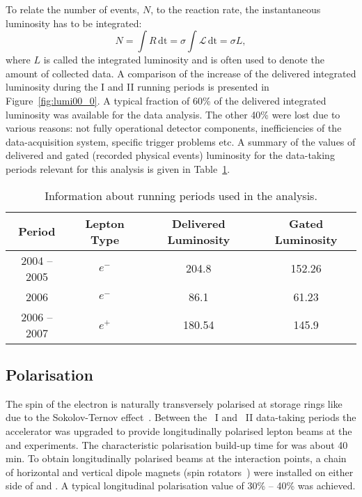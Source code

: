 To relate the number of events, $N$, to the reaction rate, the instantaneous luminosity has to be integrated:
\begin{equation}
	N = \int{R\,\mathrm{dt}} = \sigma\int{\mathcal{L}\,\mathrm{dt}} = \sigma L,
\end{equation}
where $L$ is called the integrated luminosity and is often used to denote the amount of collected data. A comparison of the increase of the delivered integrated luminosity during the \hera I and \hera II running periods is presented in Figure~\ref{fig:lumi00_0}. A typical fraction of 60\% of the delivered integrated luminosity was available for the data analysis. The other 40\% were lost due to various reasons: not fully operational detector components, inefficiencies of the data-acquisition system, specific trigger problems etc. A summary of the values of delivered and gated (recorded physical events) luminosity for the data-taking periods relevant for this analysis is given in Table~\ref{tab:heraruns}.

\begin{table}
	\centering
		\begin{tabular}[h]{|c|c|c|c|}
		  \hline
			Period & Lepton Type & Delivered Luminosity & Gated Luminosity \\
			\hline \hline
			2004 -- 2005 & $e^{-}$  & 204.8 \invpb  & 152.26 \invpb \\
			2006         & $e^{-}$  & 86.1 \invpb  &  61.23 \invpb \\
			2006 -- 2007 & $e^{+}$  & 180.54 \invpb  & 145.9 \invpb \\
			\hline
		\end{tabular}
	\caption{Information about \hera running periods used in the analysis.}
	\label{tab:heraruns}
\end{table}

\subsection{Polarisation}
\label{subsec:polarisation}
The spin of the electron is naturally transversely polarised at storage rings like \hera due to the Sokolov-Ternov effect~\cite{Sokolov:1963zn,Baier:1969hw}. Between the \hera~I and \hera~II data-taking periods the accelerator was upgraded to provide longitudinally polarised lepton beams at the \zeus and \hone experiments. The characteristic polarisation build-up time for \hera was about 40 min. To obtain longitudinally polarised beams at the interaction points, a chain of horizontal and vertical dipole magnets (spin rotators~\cite{Barber:1994ew}) were installed on either side of \zeus and \hone. A typical longitudinal polarisation value of 30\% -- 40\% was achieved.

